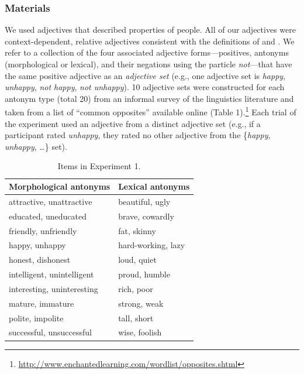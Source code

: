 \documentclass[floatsintext,doc]{apa6}
\let\rmarkdownfootnote\footnote%
\def\footnote{\protect\rmarkdownfootnote}
\begin{document}
\subsubsection{Materials}\label{materials}%

We used adjectives that described properties of people.
All of our adjectives were context-dependent, relative adjectives consistent with the definitions of  and .
We refer to a collection of the four associated adjective forms---positives, antonyms (morphological or lexical), and their negations using the particle \emph{not}---that have the same positive adjective as an \emph{adjective set} (e.g., one adjective set is \emph{happy}, \emph{unhappy}, \emph{not happy}, \emph{not unhappy}).
10 adjective sets were constructed for each antonym type (total 20) from an informal survey of the linguistics literature and taken from a list of \enquote{common opposites} available online (Table 1).\footnote{\url{http://www.enchantedlearning.com/wordlist/opposites.shtml}}
Each trial of the experiment used an adjective from a distinct adjective set (e.g., if a participant rated \emph{unhappy}, they rated no other adjective from the \{\emph{happy}, \emph{unhappy}, \ldots{}\} set).


\begin{table}[h]
\centering
\begingroup\fontsize{10pt}{11pt}\selectfont
\begin{tabular}{ll}
  \hline
Morphological antonyms & Lexical antonyms \\ 
  \hline
attractive, unattractive & beautiful, ugly \\ 
  educated, uneducated & brave, cowardly \\ 
  friendly, unfriendly & fat, skinny \\ 
  happy, unhappy & hard-working, lazy \\ 
  honest, dishonest & loud, quiet \\ 
  intelligent, unintelligent & proud, humble \\ 
  interesting, uninteresting & rich, poor \\ 
  mature, immature & strong, weak \\ 
  polite, impolite & tall, short \\ 
  successful, unsuccessful & wise, foolish \\ 
   \hline
\end{tabular}
\endgroup
\caption{Items in Experiment 1.} 
\end{table}
\end{document}
